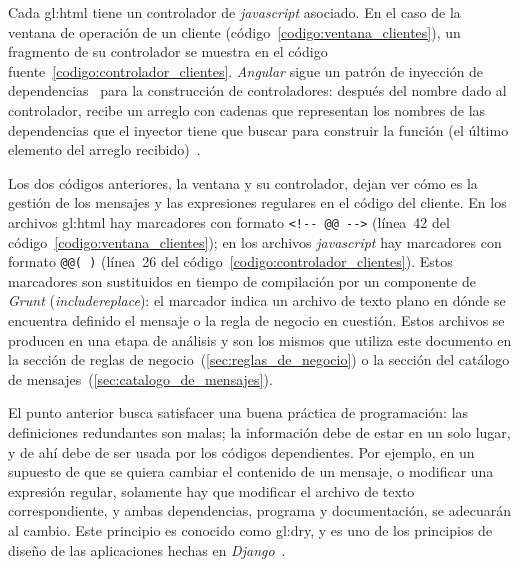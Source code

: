 
Cada \gls{gl:html} tiene un controlador de \textit{javascript} asociado. En el
caso de la ventana de operación de un cliente
(código~\ref{codigo:ventana_clientes}), un fragmento de su controlador se
muestra en el código fuente~\ref{codigo:controlador_clientes}. \textit{Angular}
sigue un patrón de inyección de dependencias~\cite{inyeccion_de_dependencias}
para la construcción de controladores: después del nombre dado al controlador,
recibe un arreglo con cadenas que representan los nombres de las dependencias
que el inyector tiene que buscar para construir la función (el último elemento
del arreglo recibido)~\cite{angular_inyector}.



Los dos códigos anteriores, la ventana y su controlador, dejan ver cómo es la
gestión de los mensajes y las expresiones regulares en el código del cliente.
En los archivos \gls{gl:html} hay marcadores con formato \verb|<!-- @@ -->|
(línea~42 del código~\ref{codigo:ventana_clientes}); en los archivos
\textit{javascript} hay marcadores con formato \verb|@@( )| (línea~26 del
código~\ref{codigo:controlador_clientes}). Estos marcadores son sustituidos en
tiempo de compilación por un componente de \textit{Grunt}
(\textit{includereplace}): el marcador indica un archivo de texto plano en
dónde se encuentra definido el mensaje o la regla de negocio en cuestión. Estos
archivos se producen en una etapa de análisis y son los mismos que utiliza este
documento en la sección de reglas de negocio~(\ref{sec:reglas_de_negocio}) o la
sección del catálogo de mensajes~(\ref{sec:catalogo_de_mensajes}).

El punto anterior busca satisfacer una buena práctica de programación: las
definiciones redundantes son malas; la información debe de estar en un solo
lugar, y de ahí debe de ser usada por los códigos dependientes. Por ejemplo,
en un supuesto de que se quiera cambiar el contenido de un mensaje, o modificar
una expresión regular, solamente hay que modificar el archivo de texto
correspondiente, y ambas dependencias, programa y documentación, se adecuarán
al cambio. Este principio es conocido como \gls{gl:dry}, y es uno de los
principios de diseño de las aplicaciones hechas en
\textit{Django}~\cite{django_principios_de_disenio}.

